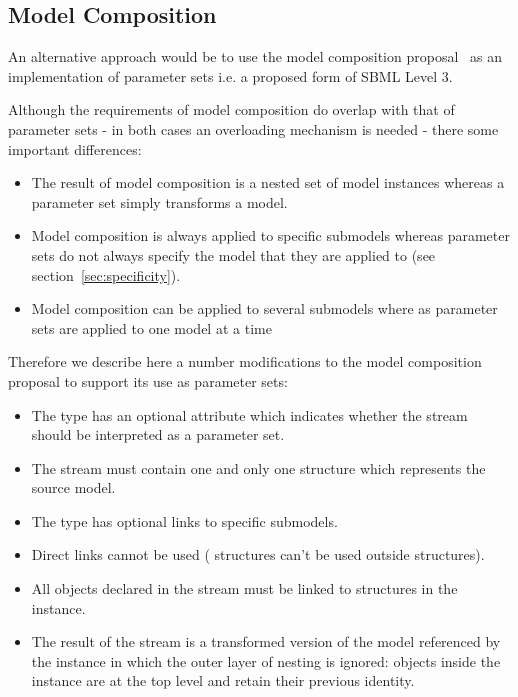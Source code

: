 \documentclass[10pt,twocolumntoc]{cekarticle}
\begin{document}
\subsection{Model Composition}

An alternative approach would be to use the model composition proposal~\citep{finney:2003b}
as an implementation of parameter sets i.e. a proposed form of SBML Level 3.

Although the requirements of model composition do overlap with that
of parameter sets - in both cases an overloading mechanism is needed - there some important differences:

\begin{itemize}
\item The result of model composition is a nested set of model instances
whereas a parameter set simply transforms a model.  
\item Model composition is
always applied to specific submodels whereas parameter sets do not always specify the model that they
are applied to (see section~\ref{sec:specificity}).
\item Model composition can be applied to several submodels where as parameter sets are applied to one model at a time
\end{itemize}
Therefore we describe here a number modifications to the model composition proposal to support its use as parameter sets:

\begin{itemize}
\item The  type has an optional attribute  which indicates whether the stream should be interpreted as a parameter set.
\item The stream must contain one and only one  structure which represents the source model.
\item The  type has optional links to specific submodels.
\item Direct links cannot be used ( structures can't be used outside  structures).
\item All objects declared in the stream must be linked to structures in the instance.
\item The result of the stream is a transformed version of the model referenced by the instance in which the outer layer of nesting is ignored:
objects inside the instance are at the top level and retain their previous identity.
\end{itemize}
\end{document}

